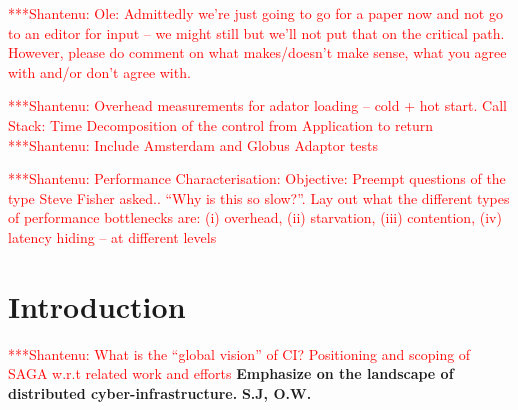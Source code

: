 \documentclass[a4paper,10pt]{article}
\newcommand{\jhanote}[1]{  {\textcolor{red}     { ***Shantenu: #1 }}}
\newcommand{\jhanote}[1]{}
\begin{document}
\jhanote{Ole: Admittedly we're just going to go for a paper now and
  not go to an editor for input -- we might still but we'll not put
  that on the critical path. However, please do comment on what
  makes/doesn't make sense, what you agree with and/or don't agree
  with.}



\jhanote{Overhead measurements for adator loading -- cold + hot
  start. Call Stack: Time Decomposition of the control from
  Application to return} \jhanote{Include Amsterdam and Globus Adaptor
  tests}

\jhanote{Performance Characterisation: Objective: Preempt questions of
  the type Steve Fisher asked.. ``Why is this so slow?''. Lay out what
  the different types of performance bottlenecks are: (i) overhead,
  (ii) starvation, (iii) contention, (iv) latency hiding -- at
  different levels}






\section{Introduction}



\jhanote{What is the ``global vision'' of CI? Positioning and scoping
  of SAGA w.r.t related work and efforts}
\textbf{Emphasize on the landscape of distributed
  cyber-infrastructure.} \textbf{S.J, O.W.}


 
\end{document}
